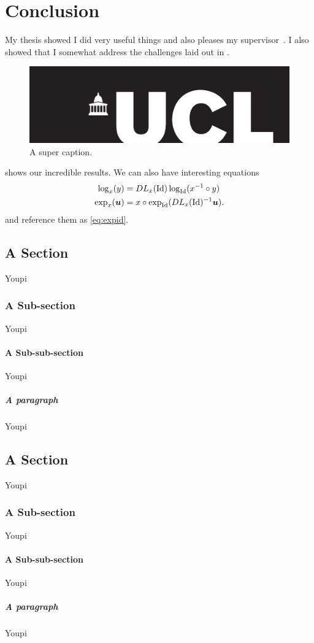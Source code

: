 \chapter{Conclusion}
\label{chap:conclusion}
\minitoc


My thesis showed I did very useful things and also pleases my supervisor~\cite{Ourselin:MICCAI:00}. I also showed that I somewhat address the challenges laid out in .

\begin{figure}[htb!]
\centering
\includegraphics[width=0.60\linewidth]{figs/University_College_London_logo}
\caption{A super caption.\label{fig:logo}}
\end{figure}

 shows our incredible results. We can also have interesting equations
\begin{align}
\log_x(y) &= DL_x(\operatorname{Id}) \log_{\operatorname{Id}}(x^{-1} \circ y) \label{eq:logid}\\
\exp_{x}(\boldsymbol{u}) &= x \circ \exp_{\operatorname{Id}}( DL_x(\operatorname{Id})^{-1} \boldsymbol{u} ).
\label{eq:expid}
\end{align}
and reference them as \eqref{eq:expid}.

\section{A Section}
%
Youpi

\subsection{A Sub-section}
%
Youpi

\subsubsection{A Sub-sub-section}
%
Youpi

\paragraph{A paragraph}
%
Youpi

\section{A Section}
%
Youpi

\subsection{A Sub-section}
%
Youpi

\subsubsection{A Sub-sub-section}
%
Youpi

\paragraph{A paragraph}
%
Youpi